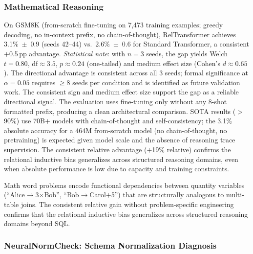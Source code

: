 \documentclass[conference]{IEEEtran}
\begin{document}
\subsubsection{Mathematical Reasoning}

On GSM8K (from-scratch fine-tuning on 7,473 training examples; greedy decoding, no in-context prefix, no chain-of-thought), RelTransformer achieves {3.1\%~$\pm$~0.9} (seeds 42--44) vs.\ {2.6\%~$\pm$~0.6} for Standard Transformer, a consistent $+$0.5\,pp advantage. \textit{Statistical note}: with $n{=}3$ seeds, the gap yields Welch $t{=}0.80$, df${\approx}3.5$, $p{\approx}0.24$ (one-tailed) and medium effect size (Cohen's $d{\approx}0.65$). The directional advantage is consistent across all 3 seeds; formal significance at $\alpha{=}0.05$ requires ${\geq}8$ seeds per condition and is identified as future validation work. The consistent sign and medium effect size support the gap as a reliable directional signal. The evaluation uses fine-tuning only without any 8-shot formatted prefix, producing a clean architectural comparison. SOTA results ($>$90\%) use 70B$+$ models with chain-of-thought and self-consistency; the 3.1\% absolute accuracy for a 464M from-scratch model (no chain-of-thought, no pretraining) is expected given model scale and the absence of reasoning trace supervision. The consistent relative advantage ($+$19\% relative) confirms the relational inductive bias generalizes across structured reasoning domains, even when absolute performance is low due to capacity and training constraints.

Math word problems encode functional dependencies between quantity variables (``Alice$\to$3$\times$Bob'', ``Bob$\to$Carol$+$5'') that are structurally analogous to multi-table joins. The consistent relative gain without problem-specific engineering confirms that the relational inductive bias generalizes across structured reasoning domains beyond SQL.

\subsubsection{NeuralNormCheck: Schema Normalization Diagnosis}
\label{sec:neuralnormcheck}
\end{document}

